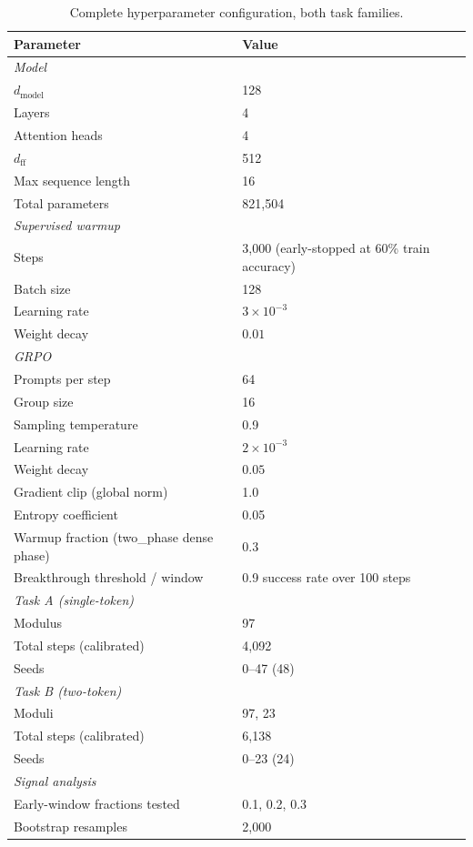 \documentclass{article}
\begin{document}
\begin{table}[h]
\centering
\caption{Complete hyperparameter configuration, both task families.}
\begin{tabular}{ll}
\toprule
Parameter & Value \\
\midrule
\multicolumn{2}{l}{\textit{Model}} \\
$d_{\text{model}}$ & 128 \\
Layers & 4 \\
Attention heads & 4 \\
$d_{\text{ff}}$ & 512 \\
Max sequence length & 16 \\
Total parameters & 821,504 \\
\midrule
\multicolumn{2}{l}{\textit{Supervised warmup}} \\
Steps & 3,000 (early-stopped at 60\% train accuracy) \\
Batch size & 128 \\
Learning rate & $3\times10^{-3}$ \\
Weight decay & $0.01$ \\
\midrule
\multicolumn{2}{l}{\textit{GRPO}} \\
Prompts per step & 64 \\
Group size & 16 \\
Sampling temperature & 0.9 \\
Learning rate & $2\times10^{-3}$ \\
Weight decay & $0.05$ \\
Gradient clip (global norm) & 1.0 \\
Entropy coefficient & 0.05 \\
Warmup fraction (two\_phase dense phase) & 0.3 \\
Breakthrough threshold / window & 0.9 success rate over 100 steps \\
\midrule
\multicolumn{2}{l}{\textit{Task A (single-token)}} \\
Modulus & 97 \\
Total steps (calibrated) & 4,092 \\
Seeds & 0--47 (48) \\
\midrule
\multicolumn{2}{l}{\textit{Task B (two-token)}} \\
Moduli & 97, 23 \\
Total steps (calibrated) & 6,138 \\
Seeds & 0--23 (24) \\
\midrule
\multicolumn{2}{l}{\textit{Signal analysis}} \\
Early-window fractions tested & 0.1, 0.2, 0.3 \\
Bootstrap resamples & 2,000 \\
\bottomrule
\end{tabular}
\end{table}
\end{document}

